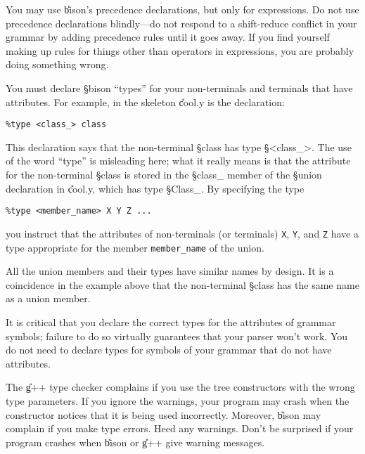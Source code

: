 You may use \U{bison}'s precedence declarations, but only for expressions.
Do not use precedence declarations blindly---do not respond
to a shift-reduce conflict in your grammar by adding precedence
rules until it goes away.  If you find yourself making up rules for
things other than operators in expressions,
you are probably doing something wrong.

You must declare \S{bison} ``types'' for your non-terminals and terminals that
have attributes.  For example, in the skeleton \U{cool.y}
is the declaration:
\begin{verbatim}
%type <class_> class
\end{verbatim}
This declaration says that the non-terminal \S{class} has type \S{<class\_>}.
The use of the word ``type'' is misleading here; what it really means is that
the attribute for the non-terminal \S{class} is stored in the \S{class\_}
member of the \S{union} declaration in \U{cool.y}, which has type
\S{Class\_}.   By specifying the type  
\begin{verbatim}
%type <member_name> X Y Z ...
\end{verbatim}
you instruct  that the attributes of non-terminals (or terminals)
{\tt X}, {\tt Y}, and {\tt Z} have a type appropriate for the member
{\tt member\_name} of the union.

All the union members and their types have similar names by
design.  It is a coincidence in the example above that the non-terminal \S{class}
has the same name as a union member.

It is critical that you declare the correct types for 
the attributes of grammar symbols; failure to do so virtually guarantees
that your parser won't work.  You do not need to declare types for
symbols of your grammar that do not have attributes.

The \U{g++} type checker complains if you use the tree constructors with the
wrong type parameters.  If you ignore the warnings, your program may
crash when the constructor notices that it is being used incorrectly.
Moreover, \U{bison} may complain if you make type errors.
Heed any warnings.  Don't be surprised if your program crashes when
\U{bison} or \U{g++} give warning messages.




